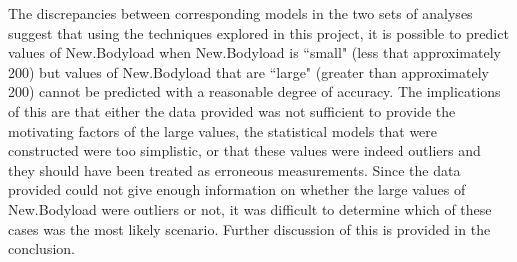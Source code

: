 The discrepancies between corresponding models in the two sets of analyses suggest that using the techniques explored in this project, it is possible to predict values of New.Bodyload when New.Bodyload is ``small" (less that approximately 200) but values of New.Bodyload that are ``large" (greater than approximately 200) cannot be predicted with a reasonable degree of accuracy. The implications of this are that either the data provided was not sufficient to provide the motivating factors of the large values, the statistical models that were constructed were too simplistic, or that these values were indeed outliers and they should have been treated as erroneous measurements. Since the data provided could not give enough information on whether the large values of New.Bodyload were outliers or not, it was difficult to determine which of these cases was the most likely scenario. Further discussion of this is provided in the conclusion.
